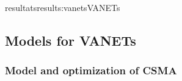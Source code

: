 \documentclass{ra2016}
\begin{document}
\begin{module}{resultats}{results:vanets}{VANETs}
\subsection{Models for VANETs}

\begin{participants}
\end{participants}

%

\subsubsection{Model and optimization of CSMA}


\end{module}
\end{document}
